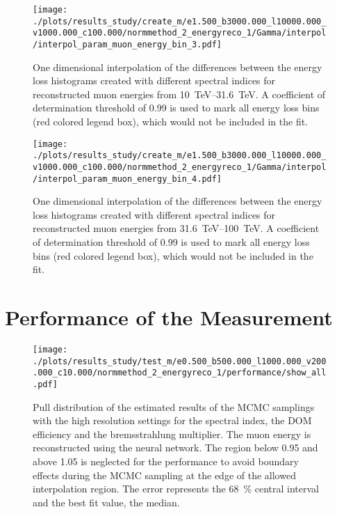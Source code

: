\begin{figure}[H]
    \centering
    \texttt{[image: ./plots/results\_study/create\_m/e1.500\_b3000.000\_l10000.000\_v1000.000\_c100.000/normmethod\_2\_energyreco\_1/Gamma/interpol/interpol\_param\_muon\_energy\_bin\_3.pdf]}
    \caption{One dimensional interpolation of the differences between the energy loss histograms created with different spectral indices for reconstructed muon energies from \SIrange{10}{31.6}{TeV}. A coefficient of determination threshold of \num{0.99} is used to mark all energy loss bins (red colored legend box), which would not be included in the fit.}
    \label{fig:study_1d_interpol_mu3_nn_low_gamma}
\end{figure}

\begin{figure}[H]
    \centering
    \texttt{[image: ./plots/results\_study/create\_m/e1.500\_b3000.000\_l10000.000\_v1000.000\_c100.000/normmethod\_2\_energyreco\_1/Gamma/interpol/interpol\_param\_muon\_energy\_bin\_4.pdf]}
    \caption{One dimensional interpolation of the differences between the energy loss histograms created with different spectral indices for reconstructed muon energies from \SIrange{31.6}{100}{TeV}. A coefficient of determination threshold of \num{0.99} is used to mark all energy loss bins (red colored legend box), which would not be included in the fit.}
    \label{fig:study_1d_interpol_mu4_nn_low_gamma}
\end{figure}

%
\section{Performance of the Measurement} \label{sec:study_perform_result_all}
%

\begin{figure}
    \centering
    \texttt{[image: ./plots/results\_study/test\_m/e0.500\_b500.000\_l1000.000\_v200.000\_c10.000/normmethod\_2\_energyreco\_1/performance/show\_all.pdf]}
    \caption{Pull distribution of the estimated results of the MCMC samplings with the high resolution settings for the spectral index, the DOM efficiency and the bremsstrahlung multiplier. The muon energy is reconstructed using the neural network. The region below 0.95 and above 1.05 is neglected for the performance to avoid boundary effects during the MCMC sampling at the edge of the allowed interpolation region. The error represents the \SI{68}{\%} central interval and the best fit value, the median.}
    \label{fig:study_result_pull_high_nn}
\end{figure}

